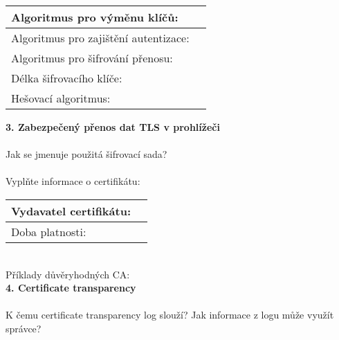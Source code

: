 \documentclass[a4paper,11pt]{article}
\begin{document}
\renewcommand\arraystretch{1.3}
\begin{tabular}{|l|r|}
\hline
Algoritmus pro výměnu klíčů: & \hspace{25.2em} \\ \hline
Algoritmus pro zajištění autentizace: & \\ \hline
Algoritmus pro šifrování přenosu: & \\ \hline
Délka šifrovacího klíče: & \\ \hline
Hešovací algoritmus: & \\ \hline
\end{tabular}
\renewcommand\arraystretch{1}
\vspace{0.5cm}

\textbf{3. Zabezpečený přenos dat TLS v prohlížeči} \\
~\\
Jak se jmenuje použitá šifrovací sada? \underline{\hspace{7cm}}\\
~\\
Vyplňte informace o certifikátu:\\

\renewcommand\arraystretch{1.3}
\begin{tabular}{|l|r|}
\hline
Vydavatel certifikátu: & \hspace{30em} \\ \hline
Doba platnosti: & \\ \hline
\end{tabular}
\renewcommand\arraystretch{1}
\vspace{0.5cm}
~\\
Příklady důvěryhodných CA: \underline{\hspace{11cm}}\\


\textbf{4. Certificate transparency} \\
~\\
K čemu certificate transparency log slouží? Jak informace z logu může využít správce?
~\\
~\\
~\\
\underline{\hspace{16cm}}

\thispagestyle{empty}
\end{document}
